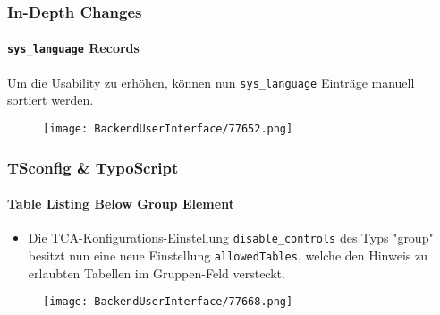 
\begin{frame}[fragile]
	\frametitle{In-Depth Changes}
	\framesubtitle{\texttt{sys\_language} Records}

	Um die Usability zu erhöhen, können nun \texttt{sys\_language} Einträge manuell sortiert werden.

	\begin{figure}
		\texttt{[image: BackendUserInterface/77652.png]}
	\end{figure}

\end{frame}


\begin{frame}[fragile]
	\frametitle{TSconfig \& TypoScript}
	\framesubtitle{Table Listing Below Group Element}

	\begin{itemize}

		\item Die TCA-Konfigurations-Einstellung \texttt{disable\_controls} des Typs "group"
			besitzt nun eine neue Einstellung \texttt{allowedTables}, welche den Hinweis zu
			erlaubten Tabellen im Gruppen-Feld versteckt.

	\end{itemize}

	\begin{figure}
		\texttt{[image: BackendUserInterface/77668.png]}
	\end{figure}

\end{frame}

